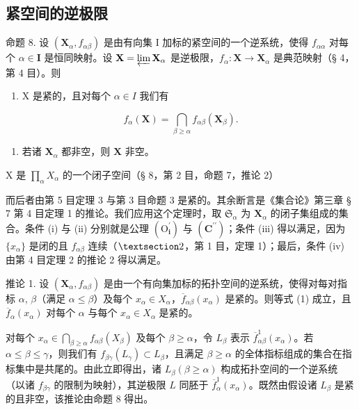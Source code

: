 \subsection{紧空间的逆极限}

命题 8. 设 \((\mathbf{X}_{\alpha}, f_{\alpha \beta})\) 是由有向集 I 加标的紧空间的一个逆系统，使得 \(f_{\alpha \alpha}\) 对每个 \(\alpha \in \mathbf{I}\) 是恒同映射。设 \(\mathbf{X} = \varprojlim \mathbf{X}_{\alpha}\) 是逆极限，\(f_{\alpha}: \mathbf{X} \to \mathbf{X}_{\alpha}\) 是典范映射（§ 4，第 4 目）。则

\begin{enumerate}
\def\labelenumi{\alph{enumi})}
\tightlist
\item
  X 是紧的，且对每个 \(\alpha \in I\) 我们有
\end{enumerate}

\[
f _ {\alpha} (\mathbf {X}) = \bigcap_ {\beta \geqslant \alpha} f _ {\alpha \beta} (\mathbf {X} _ {\beta}).\tag{I}
\]

\begin{enumerate}
\def\labelenumi{\alph{enumi})}
\setcounter{enumi}{1}
\tightlist
\item
  若诸 \(\mathbf{X}_{\alpha}\) 都非空，则 \(\mathbf{X}\) 非空。
\end{enumerate}

X 是 \(\prod_{\alpha} X_{\alpha}\) 的一个闭子空间（§ 8，第 2 目，命题 7，推论 2）

而后者由第 5 目定理 3 与第 3 目命题 3 是紧的。其余断言是《集合论》第三章 § 7 第 4 目定理 1 的推论。我们应用这个定理时，取 \(\mathfrak{S}_{\alpha}\) 为 \(\mathbf{X}_{\alpha}\) 的闭子集组成的集合。条件 (i) 与 (ii) 分别就是公理 \((\mathrm{O}_{\mathbf{i}}^{\prime})\) 与 \((\mathbf{C}^{\prime \prime})\)；条件 (iii) 得以满足，因为 \(\{x_{\alpha}\}\) 是闭的且 \(f_{\alpha \beta}\) 连续（\(\S 2\)，第 1 目，定理 1）；最后，条件 (iv) 由第 4 目定理 2 的推论 2 得以满足。

推论 1. 设 \((\mathbf{X}_{\alpha}, f_{\alpha\beta})\) 是由一个有向集加标的拓扑空间的逆系统，使得对每对指标 \(\alpha\), \(\beta\)（满足 \(\alpha \leqslant \beta\)）及每个 \(x_{\alpha} \in X_{\alpha}\)，\(\overline{f}_{\alpha\beta}(x_{\alpha})\) 是紧的。则等式 (1) 成立，且 \(\overline{f}_{\alpha}(x_{\alpha})\) 对每个 \(\alpha\) 与每个 \(x_{\alpha} \in X_{\alpha}\) 是紧的。

对每个 \(x_{\alpha} \in \bigcap_{\beta \geqslant \alpha} f_{\alpha \beta}(X_{\beta})\) 及每个 \(\beta \geqslant \alpha\)，令 \(L_{\beta}\) 表示 \(\overline{f}_{\alpha \beta}^{1}(x_{\alpha})\)。若 \(\alpha \leqslant \beta \leqslant \gamma\)，则我们有 \(f_{\beta \gamma}(L_{\gamma}) \subset L_{\beta}\)，且满足 \(\beta \geqslant \alpha\) 的全体指标组成的集合在指标集中是共尾的。由此立即得出，诸 \(L_{\beta} (\beta \geqslant \alpha)\) 构成拓扑空间的一个逆系统（以诸 \(f_{\beta \gamma}\) 的限制为映射），其逆极限 \(L\) 同胚于 \(\overline{f}_{\alpha}^{1}(x_{\alpha})\)。既然由假设诸 \(L_{\beta}\) 是紧的且非空，该推论由命题 8 得出。

